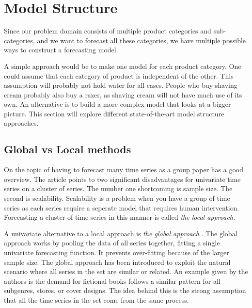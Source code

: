\section{Model Structure}
\label{section:RelatedWork:Model-structure}
Since our problem domain consists of multiple product categories and sub-categories,
and we want to forecast all these categories,
we have multiple possible ways to construct a forecasting model.

A simple approach would be to make one model for each product category.
One could assume that each category of product is independent of the other.
This assumption will probably not hold water for all cases. People who buy shaving cream probably also buy a razer, as shaving cream will not have much use of its own.
An alternative is to build a more complex model that looks at a bigger picture.
This section will explore different state-of-the-art model structure approaches.




\subsection{Global vs Local methods}
On the topic of having to forecast many time series as a group \cite{Montero-Manso2021} paper has a good overview.
The article points to two significant disadvantages for univariate time series on a cluster of series.
The number one shortcoming is sample size. The second is scalability.
Scalability is a problem when you have a group of time series as each series require a seperate model
that requires human intervention. Forecasting a cluster of time series in this manner is called
\textit{the local approach.}

A univariate alternative to a local approach is \textit{the global approach}
\citep{Rabanser2020}.
The global approach works by pooling the data of all series together, fitting a single univariate forecasting function. It prevents over-fitting because of the larger sample size.
The global approach has been introduced to exploit the natural scenario where all series
in the set are similar or related. An example given by the authors is the demand for fictional
books follows a similar pattern for all subgenres, stores, or cover designs.
The idea behind this is the strong assumption that all the time series in the set
come from the same process.

